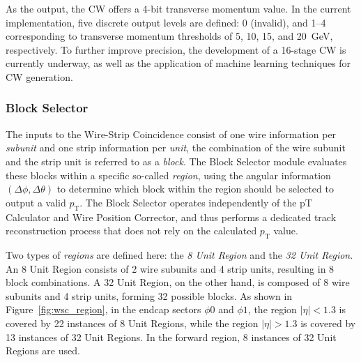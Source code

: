 

As the output, the CW offers a 4-bit transverse momentum value. In the current implementation, five discrete output levels are defined: 0 (invalid), and 1–4 corresponding to transverse momentum thresholds of 5, 10, 15, and 20~GeV, respectively. To further improve precision, the development of a 16-stage CW is currently underway, as well as the application of machine learning techniques for CW generation.

\subsubsection{Block Selector}

The inputs to the Wire-Strip Coincidence consist of one wire information per \textit{subunit} and one strip information per \textit{unit}, the combination of the wire subunit and the strip unit is referred to as a \textit{block}. The Block Selector module evaluates these blocks within a specific so-called \textit{region}, using the angular information \((\Delta\phi, \Delta\theta)\) to determine which block within the region should be selected to output a valid \(p_{\mathrm{T}}\). The Block Selector operates independently of the pT Calculator and Wire Position Corrector, and thus performs a dedicated track reconstruction process that does not rely on the calculated \(p_{\mathrm{T}}\) value.

Two types of \textit{regions} are defined here: the \textit{8 Unit Region} and the \textit{32 Unit Region}. An 8 Unit Region consists of 2 wire subunits and 4 strip units, resulting in 8 block combinations. A 32 Unit Region, on the other hand, is composed of 8 wire subunits and 4 strip units, forming 32 possible blocks. As shown in Figure~\ref{fig:wsc_region}, in the endcap sectors \(\phi0\) and \(\phi1\), the region \(|\eta| < 1.3\) is covered by 22 instances of 8 Unit Regions, while the region \(|\eta| > 1.3\) is covered by 13 instances of 32 Unit Regions. In the forward region, 8 instances of 32 Unit Regions are used.

